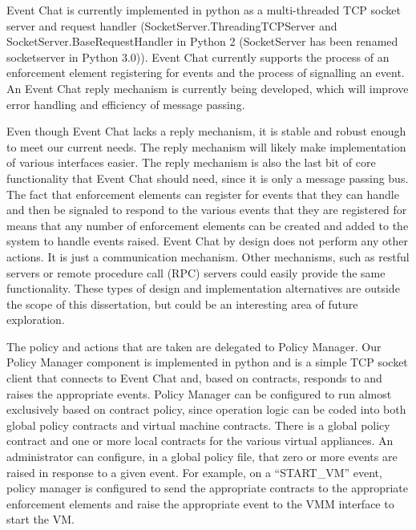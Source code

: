 Event Chat is currently implemented in python as a multi-threaded TCP socket server and request handler (SocketServer.ThreadingTCPServer and SocketServer.BaseRequestHandler in Python 2 (SocketServer has been renamed socketserver in Python 3.0)). Event Chat currently supports the process of an enforcement element registering for events and the process of signalling an event. An Event Chat reply mechanism is currently being developed, which will improve error handling and efficiency of message passing.

Even though Event Chat lacks a reply mechanism, it is stable and robust enough to meet our current needs. The reply mechanism will likely make implementation of various interfaces easier. The reply mechanism is also the last bit of core functionality that Event Chat should need, since it is only a message passing bus. The fact that enforcement elements can register for events that they can handle and then be signaled to respond to the various events that they are registered for means that any number of enforcement elements can be created and added to the system to handle events raised. Event Chat by design does not perform any other actions. It is just a communication mechanism. Other mechanisms, such as restful servers\cite{restful_phdthesis} or remote procedure call (RPC) servers could easily provide the same functionality. These types of design and implementation alternatives are outside the scope of this dissertation, but could be an interesting area of future exploration.

The policy and actions that are taken are delegated to Policy Manager. Our Policy Manager component is implemented in python and is a simple TCP socket client that connects to Event Chat and, based on contracts, responds to and raises the appropriate events. Policy Manager can be configured to run almost exclusively based on contract policy, since operation logic can be coded into both global policy contracts and virtual machine contracts. There is a global policy contract and one or more local contracts for the various virtual appliances. An administrator can configure, in a global policy file, that zero or more events are raised in response to a given event. For example, on a ``START\_VM'' event, policy manager is configured to send the appropriate contracts to the appropriate enforcement elements and raise the appropriate event to the VMM interface to start the VM. 

